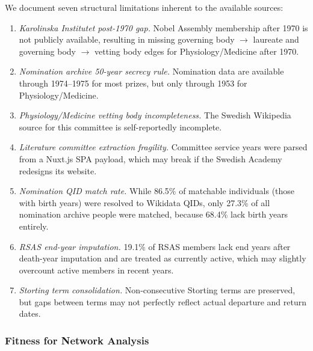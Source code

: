 \documentclass[11pt]{article}
\begin{document}
We document seven structural limitations inherent to the available sources:
\begin{enumerate}
    \item \emph{Karolinska Institutet post-1970 gap.} Nobel Assembly membership after 1970 is not publicly available, resulting in missing governing body $\to$ laureate and governing body $\to$ vetting body edges for Physiology/Medicine after 1970.

    \item \emph{Nomination archive 50-year secrecy rule.} Nomination data are available through 1974--1975 for most prizes, but only through 1953 for Physiology/Medicine.

    \item \emph{Physiology/Medicine vetting body incompleteness.} The Swedish Wikipedia source for this committee is self-reportedly incomplete.

    \item \emph{Literature committee extraction fragility.} Committee service years were parsed from a Nuxt.js SPA payload, which may break if the Swedish Academy redesigns its website.

    \item \emph{Nomination QID match rate.} While 86.5\% of matchable individuals (those with birth years) were resolved to Wikidata QIDs, only 27.3\% of all nomination archive people were matched, because 68.4\% lack birth years entirely.

    \item \emph{RSAS end-year imputation.} 19.1\% of RSAS members lack end years after death-year imputation and are treated as currently active, which may slightly overcount active members in recent years.

    \item \emph{Storting term consolidation.} Non-consecutive Storting terms are preserved, but gaps between terms may not perfectly reflect actual departure and return dates.
\end{enumerate}

\subsubsection{Fitness for Network Analysis}
\end{document}
